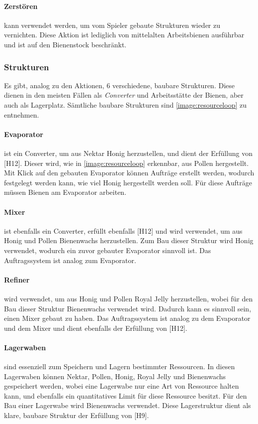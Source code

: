 \paragraph{Zerstören} kann verwendet werden, um vom Spieler gebaute Strukturen wieder zu vernichten. Diese Aktion ist lediglich von mittelalten Arbeitsbienen ausführbar und ist auf den Bienenstock beschränkt.

\subsubsection{Strukturen}
Es gibt, analog zu den Aktionen, 6 verschiedene, baubare Strukturen. Diese dienen in den meisten Fällen als \textit{Converter} und Arbeitsstätte der Bienen, aber auch als Lagerplatz. Sämtliche baubare Strukturen sind \autoref{image:resourceloop} zu entnehmen.

\paragraph{Evaporator} ist ein Converter, um aus Nektar Honig herzustellen, und dient der Erfüllung von [H12]. Dieser wird, wie in \autoref{image:resourceloop} erkennbar, aus Pollen hergestellt. Mit Klick auf den gebauten Evaporator können Aufträge erstellt werden, wodurch festgelegt werden kann, wie viel Honig hergestellt werden soll. Für diese Aufträge müssen Bienen am Evaporator arbeiten.

\paragraph{Mixer} ist ebenfalls ein Converter, erfüllt ebenfalls [H12] und wird verwendet, um aus Honig und Pollen Bienenwachs herzustellen. Zum Bau dieser Struktur wird Honig verwendet, wodurch ein zuvor gebauter Evaporator sinnvoll ist. Das Auftragssystem ist analog zum Evaporator.

\paragraph{Refiner} wird verwendet, um aus Honig und Pollen Royal Jelly herzustellen, wobei für den Bau dieser Struktur Bienenwachs verwendet wird. Dadurch kann es sinnvoll sein, einen Mixer gebaut zu haben. Das Auftragssystem ist analog zu dem Evaporator und dem Mixer und dient ebenfalls der Erfüllung von [H12].

\paragraph{Lagerwaben} sind essenziell zum Speichern und Lagern bestimmter Ressourcen. In diesen Lagerwaben können Nektar, Pollen, Honig, Royal Jelly und Bienenwachs gespeichert werden, wobei eine Lagerwabe nur eine Art von Ressource halten kann, und ebenfalls ein quantitatives Limit für diese Ressource besitzt. Für den Bau einer Lagerwabe wird Bienenwachs verwendet. Diese Lagerstruktur dient als klare, baubare Struktur der Erfüllung von [H9].

